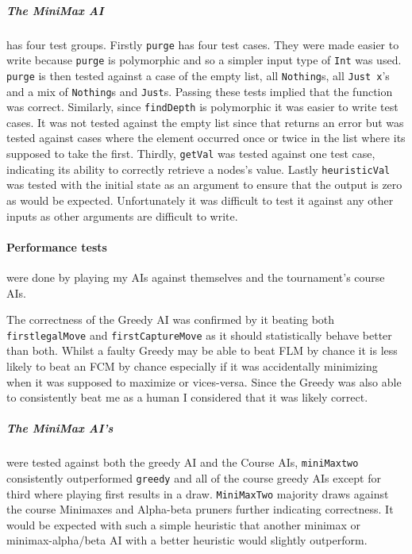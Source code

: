\documentclass[11pt]{article}
\begin{document}
\subparagraph{The MiniMax AI} has four test groups. Firstly \verb|purge| has four test cases. They were made easier to write because \verb|purge| is polymorphic and so a simpler input type of \verb|Int| was used. \verb|purge| is then tested against a case of the empty list, all \verb|Nothing|s, all \verb|Just x|'s and a mix of \verb|Nothing|s and \verb|Just|s. Passing these tests implied that the function was correct. Similarly, since \verb|findDepth| is polymorphic it was easier to write test cases. It was not tested against the empty list since that returns an error but was tested against cases where the element occurred once or twice in the list where its supposed to take the first. Thirdly, \verb|getVal| was tested against one test case, indicating its ability to correctly retrieve a nodes's value. Lastly \verb|heuristicVal| was tested with the initial state as an argument to ensure that the output is zero as would be expected. Unfortunately it was difficult to test it against any other inputs as other arguments are difficult to write.

\paragraph{Performance tests} were done by playing my AIs against themselves and the tournament's course AIs.

The correctness of the Greedy AI was confirmed by it beating both \verb|firstlegalMove| and \verb|firstCaptureMove| as it should statistically behave better than both. Whilst a faulty Greedy may be able to beat FLM by chance it is less likely to beat an FCM by chance especially if it was accidentally minimizing when it was supposed to maximize or vices-versa. Since the Greedy was also able to consistently beat me as a human I considered that it was likely correct.

\subparagraph{The MiniMax AI's} were tested against both the greedy AI and the Course AIs, \verb|miniMaxtwo| consistently outperformed \verb|greedy| and all of the course greedy AIs except for third where playing first results in a draw. \verb|MiniMaxTwo| majority draws against the course Minimaxes and Alpha-beta pruners further indicating correctness. It would be expected with such a simple heuristic that another minimax or minimax-alpha/beta AI with a better heuristic would slightly outperform. 

\end{document}
